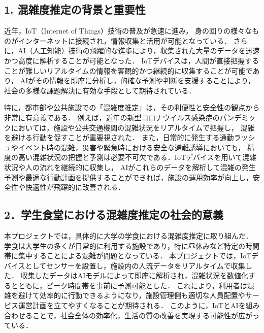 \subsection*{1. 混雑度推定の背景と重要性}
近年，IoT（Internet of Things）技術の普及が急速に進み，
身の回りの様々なものがインターネットに接続され，情報収集と活用が可能となっている．
さらに，AI（人工知能）技術の飛躍的な進歩により，収集された大量のデータを迅速かつ高度に解析することが可能となった．
IoTデバイスは，人間が直接把握することが難しいリアルタイムの情報を客観的かつ継続的に収集することが可能であり，
AIがその情報を即座に分析し，的確な予測や判断を支援することにより，社会の多様な課題解決に有効な手段として期待されている．

特に，都市部や公共施設での「混雑度推定」は，その利便性と安全性の観点から非常に有意義である．
例えば，近年の新型コロナウイルス感染症のパンデミックにおいては，施設や公共交通機関の混雑状況をリアルタイムで把握し，
混雑を避ける行動を促すことが重要視された．\cite{sano2021spatial}
また，日常的に発生する通勤ラッシュやイベント時の混雑，災害や緊急時における安全な避難誘導においても，
精度の高い混雑状況の把握と予測は必要不可欠である．IoTデバイスを用いて混雑状況や人の流れを継続的に収集し，
AIがこれらのデータを解析して混雑の発生予測や最適な行動計画を提供することができれば，施設の運用効率が向上し，安全性や快適性が飛躍的に改善される．\cite{mlit2023humanflow}

\subsection*{2．学生食堂における混雑度推定の社会的意義}
本プロジェクトでは，具体的に大学の学食における混雑度推定に取り組んだ．
学食は大学生の多くが日常的に利用する施設であり，特に昼休みなど特定の時間帯に集中することによる混雑が問題となっている．
本プロジェクトでは，IoTデバイスとしてセンサーを設置し，施設内の人流データをリアルタイムで収集した．
収集したデータはAIモデルによって即座に解析され，混雑状況を数値化するとともに，ピーク時間帯を事前に予測可能とした．
これにより，利用者は混雑を避けて効率的に行動できるようになり，施設管理側も適切な人員配置やサービス運営計画を立てやすくなることが期待される．
このように，IoTとAIを組み合わせることで，社会全体の効率化，生活の質の改善を実現する可能性が広がっている．
%
